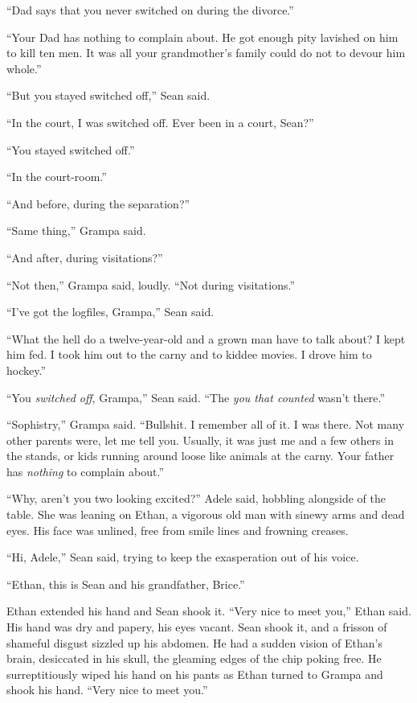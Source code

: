 “Dad says that you never switched on during the divorce.”

“Your Dad has nothing to complain about. He got enough pity lavished 
on him to kill ten men. It was all your grandmother's family could do 
not to devour him whole.”

“But you stayed switched off,” Sean said.

“In the court, I was switched off. Ever been in a court, Sean?”

“You stayed switched off.”

“In the court-room.”

“And before, during the separation?”

“Same thing,” Grampa said.

“And after, during visitations?”

“Not then,” Grampa said, loudly. “Not during visitations.”

“I've got the logfiles, Grampa,” Sean said.

“What the hell do a twelve-year-old and a grown man have to talk 
about? I kept him fed. I took him out to the carny and to kiddee 
movies. I drove him to hockey.”

“You \emph{switched off}, Grampa,” Sean said. “The \emph{you that 
counted} wasn't there.”

“Sophistry,” Grampa said. “Bullshit. I remember all of it. I was 
there. Not many other parents were, let me tell you. Usually, it was 
just me and a few others in the stands, or kids running around loose 
like animals at the carny. Your father has \emph{nothing} to complain 
about.”

“Why, aren't you two looking excited?” Adele said, hobbling 
alongside of the table. She was leaning on Ethan, a vigorous old man 
with sinewy arms and dead eyes. His face was unlined, free from smile 
lines and frowning creases.

“Hi, Adele,” Sean said, trying to keep the exasperation out of his 
voice.

“Ethan, this is Sean and his grandfather, Brice.”

Ethan extended his hand and Sean shook it. “Very nice to meet you,” 
Ethan said. His hand was dry and papery, his eyes vacant. Sean shook 
it, and a frisson of shameful disgust sizzled up his abdomen. He had a 
sudden vision of Ethan's brain, desiccated in his skull, the gleaming 
edges of the chip poking free. He surreptitiously wiped his hand on his 
pants as Ethan turned to Grampa and shook his hand. “Very nice to 
meet you.”

